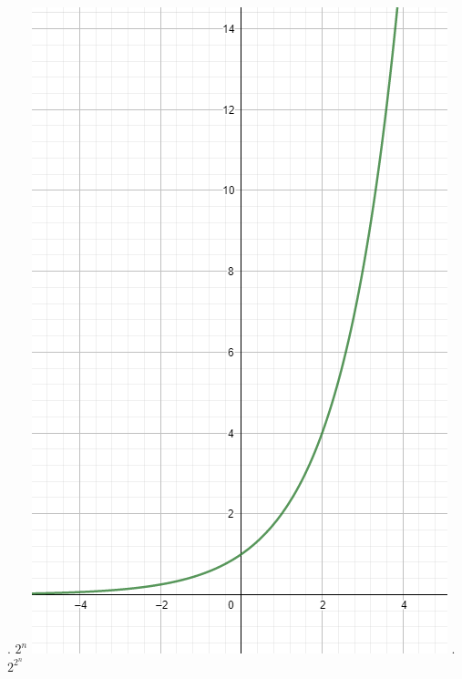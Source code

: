 \documentclass{article}
\begin{document}
\newline
\newline
{}. $2^{n}$
\newline
\newline
\newline
\includegraphics[scale = 0.5]{2tothen}
\newline
\newline
{}. $2^{2^{n}}$
\newline
\newline
\newline
\end{document}
